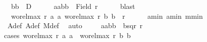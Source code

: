\begin{isabellebody}
\ {\isacharasterisk}{\kern0pt}{\isacharasterisk}{\kern0pt}{\isacharasterisk}{\kern0pt}{\isacharcolon}{\kern0pt}\ {\isachardoublequoteopen}{\isacharparenleft}{\kern0pt}b{}{\isacharcomma}{\kern0pt}b{}{\isacharparenright}{\kern0pt}\ {\isasymin}\ D{\isachardoublequoteclose}\isanewline
\ \ \ \isamarkupfalse%
\ {}{\isacharcolon}{\kern0pt}\ {\isachardoublequoteopen}{\isacharbraceleft}{\kern0pt}a{}{\isacharcomma}{\kern0pt}a{}{\isacharcomma}{\kern0pt}b{}{\isacharcomma}{\kern0pt}b{}{\isacharbraceright}{\kern0pt}\ {\isasymle}\ Field\ r{\isachardoublequoteclose}\ \isamarkupfalse%
\ {}\ {}\ \isamarkupfalse%
\ blast\isanewline
\ \ \ \isamarkupfalse%
\ {}{\isacharcolon}{\kern0pt}\ {\isachardoublequoteopen}{\isacharparenleft}{\kern0pt}wo{\isacharunderscore}{\kern0pt}rel{\isachardot}{\kern0pt}max{}\ r\ a{}\ a{}{\isacharcomma}{\kern0pt}\ wo{\isacharunderscore}{\kern0pt}rel{\isachardot}{\kern0pt}max{}\ r\ b{}\ b{}{\isacharparenright}{\kern0pt}\ {\isasymin}\ r{\isachardoublequoteclose}\isanewline
\ \ \ \isamarkupfalse%
\ {\isacharasterisk}{\kern0pt}{\isacharasterisk}{\kern0pt}{\isacharasterisk}{\kern0pt}\ a{}{\isacharunderscore}{\kern0pt}min\ a{}{\isacharunderscore}{\kern0pt}min\ m{\isacharunderscore}{\kern0pt}min\ \isamarkupfalse%
\ A{}{\isacharunderscore}{\kern0pt}def\ A{}{\isacharunderscore}{\kern0pt}def\ M{\isacharunderscore}{\kern0pt}def\ \isamarkupfalse%
\ auto\isanewline
\ \ \ \isamarkupfalse%
\ {\isachardoublequoteopen}{\isacharparenleft}{\kern0pt}{\isacharparenleft}{\kern0pt}a{}{\isacharcomma}{\kern0pt}a{}{\isacharparenright}{\kern0pt}{\isacharcomma}{\kern0pt}{\isacharparenleft}{\kern0pt}b{}{\isacharcomma}{\kern0pt}b{}{\isacharparenright}{\kern0pt}{\isacharparenright}{\kern0pt}\ {\isasymin}\ bsqr\ r{\isachardoublequoteclose}\isanewline
\ \ \ \isamarkupfalse%
{\isacharparenleft}{\kern0pt}cases\ {\isachardoublequoteopen}wo{\isacharunderscore}{\kern0pt}rel{\isachardot}{\kern0pt}max{}\ r\ a{}\ a{}\ {\isacharequal}{\kern0pt}\ wo{\isacharunderscore}{\kern0pt}rel{\isachardot}{\kern0pt}max{}\ r\ b{}\ b{}{\isachardoublequoteclose}{\isacharparenright}{\kern0pt}\isanewline

\end{isabellebody}
